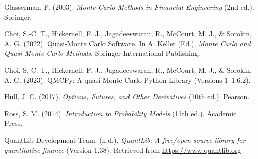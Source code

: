 \documentclass{article}
\begin{document}
\begin{thebibliography}{6}

Glasserman, P. (2003). \textit{Monte Carlo Methods in Financial Engineering} (2nd ed.). Springer.

Choi, S.-C. T., Hickernell, F. J., Jagadeeswaran, R., McCourt, M. J., \& Sorokin, A. G. (2022).
Quasi-Monte Carlo Software. In A. Keller (Ed.), \textit{Monte Carlo and Quasi-Monte Carlo Methods}.
Springer International Publishing.

Choi, S.-C. T., Hickernell, F. J., Jagadeeswaran, R., McCourt, M. J., \& Sorokin, A. G. (2023).
QMCPy: A quasi-Monte Carlo Python Library (Versions 1–1.6.2).

Hull, J. C. (2017). \textit{Options, Futures, and Other Derivatives} (10th ed.). Pearson.

Ross, S. M. (2014). \textit{Introduction to Probability Models} (11th ed.). Academic Press.

QuantLib Development Team. (n.d.). \textit{QuantLib: A free/open-source library for quantitative finance} (Version 1.38).
Retrieved from \url{https://www.quantlib.org}

\end{thebibliography}


 
\end{document}
